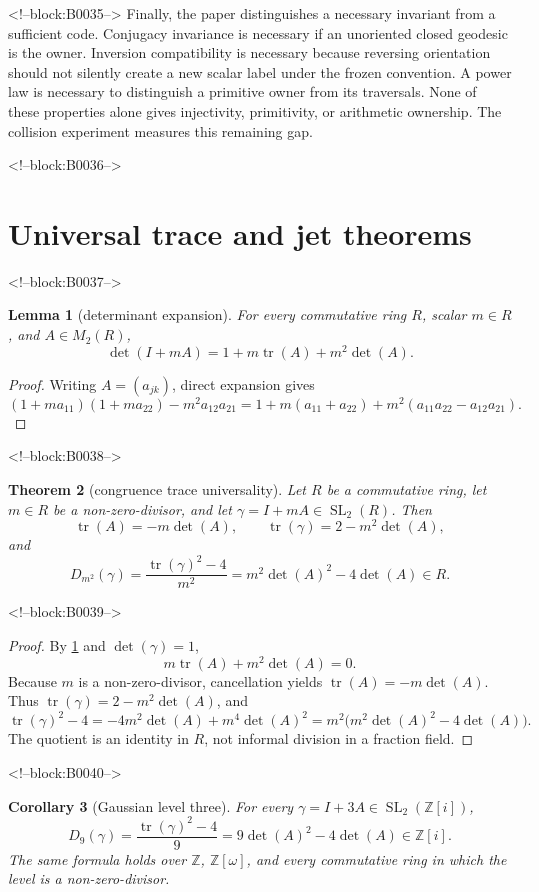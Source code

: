 \documentclass[11pt,a4paper]{article}
\newtheorem{theorem}{Theorem}[section]
\newtheorem{lemma}[theorem]{Lemma}
\newtheorem{corollary}[theorem]{Corollary}
\theoremstyle{definition}
\theoremstyle{remark}
\newcommand{\SL}{\operatorname{SL}}
\newcommand{\tr}{\operatorname{tr}}
\newcommand{\Gauss}{\mathbb{Z}[i]}
\newcommand{\Eis}{\mathbb{Z}[\omega]}
\begin{document}
<!--block:B0035-->
Finally, the paper distinguishes a necessary invariant from a sufficient code. Conjugacy invariance is necessary if an unoriented closed geodesic is the owner. Inversion compatibility is necessary because reversing orientation should not silently create a new scalar label under the frozen convention. A power law is necessary to distinguish a primitive owner from its traversals. None of these properties alone gives injectivity, primitivity, or arithmetic ownership. The collision experiment measures this remaining gap.

<!--block:B0036-->
\section{Universal trace and jet theorems}\label{sec:theorems}

<!--block:B0037-->
\begin{lemma}[determinant expansion]\label{lem:detexp}
For every commutative ring \(R\), scalar \(m\in R\), and \(A\in M_2(R)\),
\[
 \det(I+mA)=1+m\tr(A)+m^2\det(A).
\]
\end{lemma}
\begin{proof}
Writing \(A=(a_{jk})\), direct expansion gives
\[
 (1+ma_{11})(1+ma_{22})-m^2a_{12}a_{21}
 =1+m(a_{11}+a_{22})+m^2(a_{11}a_{22}-a_{12}a_{21}).
\]
\end{proof}

<!--block:B0038-->
\begin{theorem}[congruence trace universality]\label{thm:universal}
Let \(R\) be a commutative ring, let \(m\in R\) be a non-zero-divisor, and let \(\gamma=I+mA\in\SL_2(R)\). Then
\[
 \tr(A)=-m\det(A),\qquad \tr(\gamma)=2-m^2\det(A),
\]
and
\begin{equation}\label{eq:universal}
 D_{m^2}(\gamma)=\frac{\tr(\gamma)^2-4}{m^2}
 =m^2\det(A)^2-4\det(A)\in R.
\end{equation}
\end{theorem}

<!--block:B0039-->
\begin{proof}
By \cref{lem:detexp} and \(\det(\gamma)=1\),
\[
 m\tr(A)+m^2\det(A)=0.
\]
Because \(m\) is a non-zero-divisor, cancellation yields \(\tr(A)=-m\det(A)\). Thus \(\tr(\gamma)=2-m^2\det(A)\), and
\[
 \tr(\gamma)^2-4
 =-4m^2\det(A)+m^4\det(A)^2
 =m^2\bigl(m^2\det(A)^2-4\det(A)\bigr).
\]
The quotient is an identity in \(R\), not informal division in a fraction field.
\end{proof}

<!--block:B0040-->
\begin{corollary}[Gaussian level three]\label{cor:d9}
For every \(\gamma=I+3A\in\SL_2(\Gauss)\),
\[
 D_9(\gamma)=\frac{\tr(\gamma)^2-4}{9}=9\det(A)^2-4\det(A)\in\Gauss.
\]
The same formula holds over \(\mathbb Z\), \(\Eis\), and every commutative ring in which the level is a non-zero-divisor.
\end{corollary}
\end{document}
